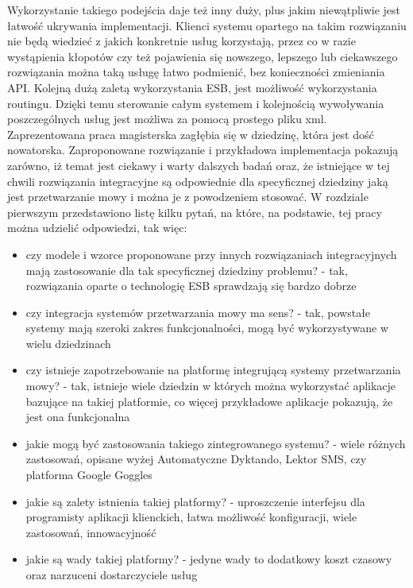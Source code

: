 Wykorzystanie takiego podejścia daje też inny duży, plus jakim niewątpliwie jest łatwość ukrywania implementacji. Klienci systemu opartego na takim rozwiązaniu nie będą wiedzieć z jakich konkretnie usług korzystają, przez co w razie wystąpienia kłopotów czy też pojawienia się nowszego, lepszego lub ciekawszego rozwiązania można taką usługę łatwo podmienić, bez konieczności zmieniania API. Kolejną dużą zaletą wykorzystania ESB, jest możliwość wykorzystania routingu. Dzięki temu sterowanie całym systemem i kolejnością wywoływania poszczególnych usług jest możliwa za pomocą prostego pliku xml.  \\
Zaprezentowana praca magisterska zagłębia się w dziedzinę, która jest dość nowatorska. Zaproponowane rozwiązanie i przykładowa implementacja pokazują zarówno, iż temat jest ciekawy i warty dalszych badań oraz, że istniejące w tej chwili rozwiązania integracyjne są odpowiednie dla specyficznej dziedziny jaką jest przetwarzanie mowy i można je z powodzeniem stosować. W rozdziale pierwszym przedstawiono listę kilku pytań, na które, na podstawie, tej pracy można udzielić odpowiedzi, tak więc:
\begin{itemize}
	\item czy modele i wzorce proponowane przy innych rozwiązaniach integracyjnych mają zastosowanie dla tak specyficznej dziedziny problemu? - tak, rozwiązania oparte o technologię ESB sprawdzają się bardzo dobrze
	\item czy integracja systemów przetwarzania mowy ma sens? - tak, powstałe systemy mają szeroki zakres funkcjonalności, mogą być wykorzystywane w wielu dziedzinach
	\item czy istnieje zapotrzebowanie na platformę integrującą systemy przetwarzania mowy? - tak, istnieje wiele dziedzin w których można wykorzystać aplikacje bazujące na takiej platformie, co więcej przykładowe aplikacje pokazują, że jest ona funkcjonalna
	\item jakie mogą być zastosowania takiego zintegrowanego systemu? - wiele różnych zastosowań, opisane wyżej Automatyczne Dyktando, Lektor SMS, czy platforma Google Goggles 
	\item jakie są zalety istnienia takiej platformy? - uproszczenie interfejsu dla programisty aplikacji klienckich, łatwa możliwość konfiguracji, wiele zastosowań, innowacyjność
	\item jakie są wady takiej platformy? - jedyne wady to dodatkowy koszt czasowy oraz narzuceni dostarczyciele usług
\end{itemize}







